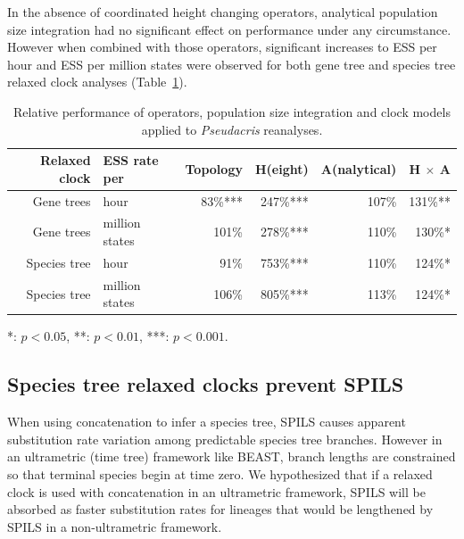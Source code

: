 \documentclass[nogrid]{MBE}%
\begin{document}
In the absence of coordinated height changing operators, analytical population
size integration had no significant effect on performance under any
circumstance. However when combined with those operators, significant increases
to ESS per hour and ESS per million states were observed for both gene tree and
species tree relaxed clock analyses (Table~\ref{tab:convergenceLM}).

\begin{table}[htb!]
\caption{Relative performance of operators, population size integration and clock models applied to \textit{Pseudacris} reanalyses.}
\label{tab:convergenceLM}
\begin{threeparttable}
\begin{tabular*}{\textwidth}{@{\extracolsep{\fill}}rlrrrr@{}}
\hline
Relaxed clock & ESS rate per & Topology & H(eight) & A(nalytical) & H $\times$ A\tabularnewline
\hline
Gene trees & hour & 83\%{***} & 247\%{***} & 107\%\hphantom{***} & 131\%{**}\hphantom{*}\tabularnewline
Gene trees & million states & 101\%\hphantom{***} & 278\%{***} & 110\%\hphantom{***} & 130\%{*}\hphantom{**}\tabularnewline
Species tree & hour & 91\%\hphantom{***} & 753\%{***} & 110\%\hphantom{***} & 124\%{*}\hphantom{**}\tabularnewline
Species tree & million states & 106\%\hphantom{***} & 805\%{***} & 113\%\hphantom{***} & 124\%{*}\hphantom{**}\tabularnewline
\hline
\end{tabular*}
\begin{tablenotes}
\item {*}: $p < 0.05$, {**}: $p < 0.01$, {***}: $p < 0.001$.
\end{tablenotes}
\end{threeparttable}
\end{table}

\subsection{Species tree relaxed clocks prevent SPILS}

When using concatenation to infer a species tree, SPILS causes apparent
substitution rate variation among predictable species tree branches. However in
an ultrametric (time tree) framework like BEAST, branch lengths are constrained so that
terminal species begin at time zero. We hypothesized that if a relaxed clock is
used with concatenation in an ultrametric framework, SPILS will be absorbed as
faster substitution rates for lineages that would be lengthened by SPILS in a
non-ultrametric framework.
\end{document}
